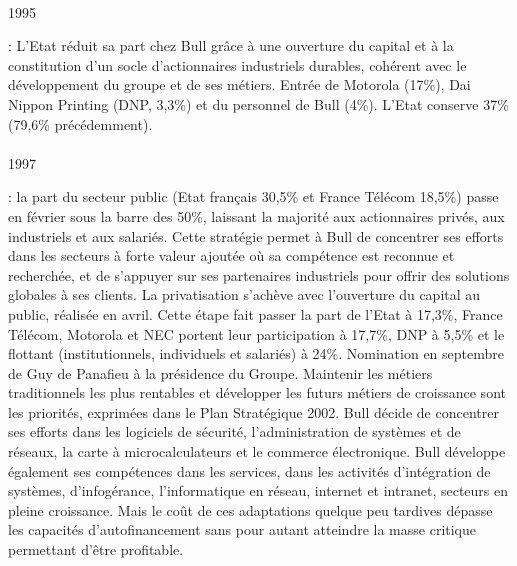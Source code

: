 \documentclass[11pt]{article}
\begin{document}
		\paragraph{}
		\begin{bf}1995\end{bf}: L’Etat réduit sa part chez Bull grâce à une ouverture du capital et à la constitution d’un 
		socle d’actionnaires industriels durables, cohérent avec le développement du groupe et de ses métiers. Entrée de 
		Motorola (17\%), Dai Nippon Printing (DNP, 3,3\%) et du personnel de Bull (4\%). L’Etat conserve 37\% (79,6\% 
		précédemment).
		\paragraph{}
		\begin{bf}1997\end{bf}: la part du secteur public (Etat français 30,5\% et France Télécom 18,5\%) passe en février 
		sous la barre des 50\%, laissant la majorité aux actionnaires privés, aux industriels et aux salariés. Cette stratégie 
		permet à Bull de concentrer ses efforts dans les secteurs à forte valeur ajoutée où sa compétence est reconnue et 
		recherchée, et de s’appuyer sur ses partenaires industriels pour offrir des solutions globales à ses clients.\newline{}
		La privatisation s’achève avec l’ouverture du capital au public, réalisée en avril. Cette étape fait passer la part de 
		l’Etat à 17,3\%, France Télécom, Motorola et NEC portent leur participation à 17,7\%, DNP à 5,5\% et le flottant 
		(institutionnels, individuels et salariés) à 24\%.\newline{}
		Nomination en septembre de Guy de Panafieu à la présidence du Groupe. Maintenir les métiers traditionnels les plus 
		rentables et développer les futurs métiers de croissance sont les priorités, exprimées dans le Plan Stratégique 2002. 
		Bull décide de concentrer ses efforts dans les logiciels de sécurité, l’administration de systèmes et de réseaux, 
		la carte à microcalculateurs et le commerce électronique.\newline{}
		Bull développe également ses compétences dans les services, dans les activités d’intégration de systèmes, 
		d’infogérance, l’informatique en réseau, internet et intranet, secteurs en pleine croissance. Mais le coût de ces 
		adaptations quelque peu tardives dépasse les capacités d’autofinancement sans pour autant atteindre la masse critique 
		permettant d’être profitable. \newline{}
\end{document}
